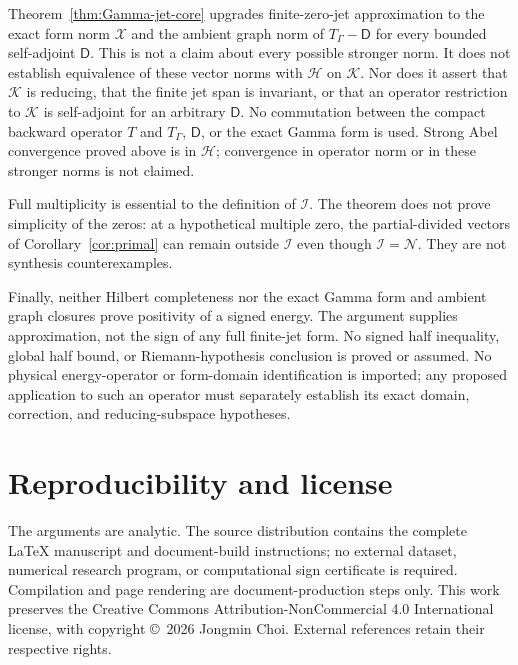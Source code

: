 \documentclass[11pt,a4paper]{article}
\numberwithin{equation}{section}
\theoremstyle{definition}
\theoremstyle{remark}
\newcommand{\Hh}{\mathcal H}
\newcommand{\Nn}{\mathcal N}
\newcommand{\Ii}{\mathcal I}
\newcommand{\Kk}{\mathcal K}
\begin{document}
Theorem~\ref{thm:Gamma-jet-core} upgrades finite-zero-jet approximation to the exact form norm $\mathcal X$ and the ambient graph norm of $T_\Gamma-\mathsf D$ for every bounded self-adjoint $\mathsf D$. This is not a claim about every possible stronger norm. It does not establish equivalence of these vector norms with $\Hh$ on $\Kk$. Nor does it assert that $\Kk$ is reducing, that the finite jet span is invariant, or that an operator restriction to $\Kk$ is self-adjoint for an arbitrary $\mathsf D$. No commutation between the compact backward operator $T$ and $T_\Gamma$, $\mathsf D$, or the exact Gamma form is used. Strong Abel convergence proved above is in $\Hh$; convergence in operator norm or in these stronger norms is not claimed.

Full multiplicity is essential to the definition of $\Ii$. The theorem does not prove simplicity of the zeros: at a hypothetical multiple zero, the partial-divided vectors of Corollary~\ref{cor:primal} can remain outside $\Ii$ even though $\Ii=\Nn$. They are not synthesis counterexamples.

Finally, neither Hilbert completeness nor the exact Gamma form and ambient graph closures prove positivity of a signed energy. The argument supplies approximation, not the sign of any full finite-jet form. No signed half inequality, global half bound, or Riemann-hypothesis conclusion is proved or assumed. No physical energy-operator or form-domain identification is imported; any proposed application to such an operator must separately establish its exact domain, correction, and reducing-subspace hypotheses.


\section*{Reproducibility and license}

The arguments are analytic. The source distribution contains the complete LaTeX manuscript and document-build instructions; no external dataset, numerical research program, or computational sign certificate is required. Compilation and page rendering are document-production steps only. This work preserves the Creative Commons Attribution-NonCommercial 4.0 International license, with copyright \copyright\ 2026 Jongmin Choi. External references retain their respective rights.
\end{document}

